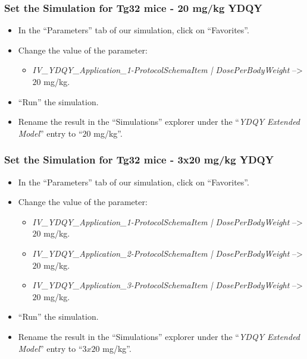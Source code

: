 \documentclass[fleqn,10pt]{physiome}
\begin{document}
\subsubsection{Set the Simulation for Tg32 mice - 20 mg/kg YDQY}
\begin{itemize}
    \item In the ``Parameters'' tab of our simulation, click on ``Favorites''.
    \item Change the value of the parameter: 
    \begin{itemize}
        \item \textit{IV\_YDQY\_Application\_1-ProtocolSchemaItem | DosePerBodyWeight} --> $20$ mg/kg.
    \end{itemize}
    \item ``Run'' the simulation.
    \item Rename the result in the ``Simulations'' explorer under the ``\textit{YDQY Extended Model}'' entry to ``$20$ mg/kg''.
\end{itemize}

\subsubsection{Set the Simulation for Tg32 mice - 3x20 mg/kg YDQY}
\begin{itemize}
    \item In the ``Parameters'' tab of our simulation, click on ``Favorites''.
    \item Change the value of the parameter: 
    \begin{itemize}
        \item \textit{IV\_YDQY\_Application\_1-ProtocolSchemaItem | DosePerBodyWeight} --> $20$ mg/kg.
        \item \textit{IV\_YDQY\_Application\_2-ProtocolSchemaItem | DosePerBodyWeight} --> $20$ mg/kg.
        \item \textit{IV\_YDQY\_Application\_3-ProtocolSchemaItem | DosePerBodyWeight} --> $20$ mg/kg.
    \end{itemize}
    \item ``Run'' the simulation.
    \item Rename the result in the ``Simulations'' explorer under the ``\textit{YDQY Extended Model}'' entry to ``$3x20$ mg/kg''.
\end{itemize}
\end{document}
